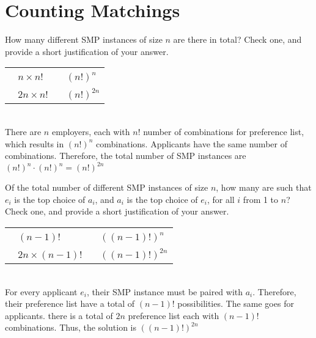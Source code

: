 \documentclass[11pt,fleqn]{exam}
\newcommand{\fillinMCmath}[1]{\begin{tikzpicture}\draw circle [radius=0.5em];\end{tikzpicture}\ #1}
\newcommand{\fillinMCmathsoln}[1]{\begin{tikzpicture}\draw[black, fill=blue] circle [radius=0.5em];\end{tikzpicture}\ #1}
\newif\ifsolutions\solutionsfalse
\newenvironment{soln}{\color{solnblue}}{}
\begin{document}
    \section{Counting Matchings}
     \begin{questions}
\question[2]
How many different SMP instances of size $n$ are there in total? Check one, and provide a short justification of your answer.

\vspace{.1in}

\ifsolutions

\else

\begin{tabular}{ll}
\hspace{1in} \fillinMCmath{} $n \times n!$ \hspace*{1.2in}&  \fillinMCmath{} $(n!)^{n}$ \\
\hspace{1in} \fillinMCmath{} $2n \times n!$ \hspace*{1.2in}&  \fillinMCmathsoln{} $(n!)^{2n}$
\end{tabular}
\\
\begin{soln}
    There are $n$ employers, each with $n!$ number of combinations for preference list, which results in $(n!)^n$ combinations. Applicants have the same number of combinations. Therefore, the total number of SMP instances are $(n!)^n\cdot (n!)^n= (n!)^{2n}$
\end{soln}
\fi

\vspace{.1in}

\question[2]
Of the total number of different SMP instances of size $n$, how many are such that $e_i$ is the top choice of $a_i$, and $a_i$ is the top choice of $e_i$, for all $i$ from 1 to $n$? Check one, and provide a short justification of your answer.

\vspace{.1in}

\ifsolutions

\else
\begin{tabular}{ll}
\hspace{1in} \fillinMCmath{} $(n-1)!$  \hspace*{.8in}&  \fillinMCmath{} $((n-1)!)^{n}$ \\
\hspace{1in} \fillinMCmath{} $2n \times (n-1)!$ \hspace*{.8in}&  \fillinMCmathsoln{} $((n-1)!)^{2n}$
\end{tabular}
\\
\begin{soln}
    For every applicant $e_i$, their SMP instance must be paired with $a_i$. Therefore, their preference list have a total of $(n-1)!$ possibilities. The same goes for applicants. there is a total of $2n$ preference list each with $(n-1)!$ combinations. Thus, the solution is $((n-1)!)^{2n}$
\end{soln}
\fi
\end{questions}
\end{document}
